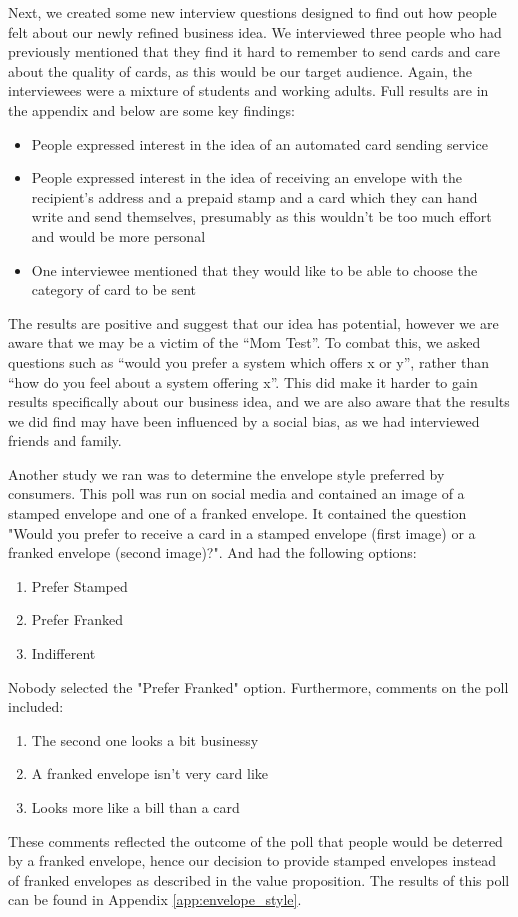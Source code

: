 \documentclass[10pt,a4paper]{article}
\begin{document}
Next, we created some new interview questions designed to find out how people felt about our newly refined business idea. We interviewed three people who had previously mentioned that they find it hard to remember to send cards and care about the quality of cards, as this would be our target audience. Again, the interviewees were a mixture of students and working adults. Full results are in the appendix and below are some key findings:
\begin{itemize}
  \item People expressed interest in the idea of an automated card sending service
  \item People expressed interest in the idea of receiving an envelope with the recipient's address and a prepaid stamp and a card which they can hand write and send themselves, presumably as this wouldn't be too much effort and would be more personal
  \item One interviewee mentioned that they would like to be able to choose the category of card to be sent
\end{itemize}

The results are positive and suggest that our idea has potential, however we are aware that we may be a victim of the ``Mom Test''. To combat this, we asked questions such as ``would you prefer a system which offers x or y'', rather than ``how do you feel about a system offering x''. This did make it harder to gain results specifically about our business idea, and we are also aware that the results we did find may have been influenced by a social bias, as we had interviewed friends and family.

Another study we ran was to determine the envelope style preferred by consumers. This poll was run on social media and contained an image of a stamped envelope and one of a franked envelope. It contained the question "Would you prefer to receive a card in a stamped envelope (first image) or a franked envelope (second image)?". And had the following options:
\begin{enumerate}
  \item{Prefer Stamped}
  \item{Prefer Franked}
  \item{Indifferent}
\end{enumerate}
Nobody selected the "Prefer Franked" option. Furthermore, comments on the poll included:
\begin{enumerate}
   \item The second one looks a bit businessy
   \item A franked envelope isn't very card like
   \item Looks more like a bill than a card
\end{enumerate}
These comments reflected the outcome of the poll that people would be deterred by a franked envelope, hence our decision to provide stamped envelopes instead of franked envelopes as described in the value proposition. The results of this poll can be found in Appendix \ref{app:envelope_style}.
\end{document}

